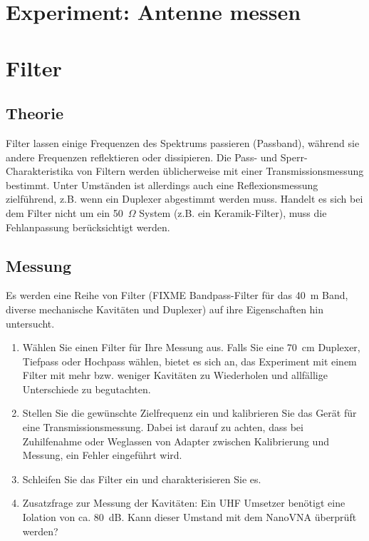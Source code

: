 \documentclass[twoside,a4paper,11pt,halfparskip,DIV=11,notitlepage]{scrartcl}
\begin{document}
\section{Experiment: Antenne messen}

\section{Filter}

\subsection{Theorie}
Filter lassen einige Frequenzen des Spektrums passieren (Passband), während
sie andere Frequenzen reflektieren oder dissipieren. Die Pass- und Sperr-Charakteristika von Filtern werden üblicherweise mit einer
Transmissionsmessung bestimmt. Unter Umständen ist allerdings
auch eine Reflexionsmessung zielführend, z.B. wenn ein Duplexer abgestimmt
werden muss. Handelt es sich bei dem Filter nicht um ein 50~$\Omega$ System
(z.B. ein Keramik-Filter), muss die Fehlanpassung berücksichtigt werden.

\subsection{Messung}
Es werden eine Reihe von Filter (FIXME Bandpass-Filter für das 40~m Band,
diverse mechanische Kavitäten und Duplexer) auf ihre Eigenschaften hin
untersucht.

\begin{enumerate}
    \item Wählen Sie einen Filter für Ihre Messung aus. Falls Sie eine 70~cm
        Duplexer, Tiefpass oder Hochpass wählen, bietet es sich an, das Experiment
        mit einem Filter mit mehr bzw. weniger Kavitäten zu Wiederholen und
        allfällige Unterschiede zu begutachten.
    \item Stellen Sie die gewünschte Zielfrequenz ein und kalibrieren Sie das
        Gerät für eine Transmissionsmessung. Dabei ist darauf zu achten, dass
        bei Zuhilfenahme oder Weglassen von Adapter zwischen Kalibrierung und
        Messung, ein Fehler eingeführt wird.
    \item Schleifen Sie das Filter ein und charakterisieren Sie es.
    \item Zusatzfrage zur Messung der Kavitäten: Ein UHF Umsetzer benötigt eine
        Iolation von ca. 80~dB. Kann dieser Umstand mit dem NanoVNA überprüft werden?


\end{enumerate}
\end{document}
